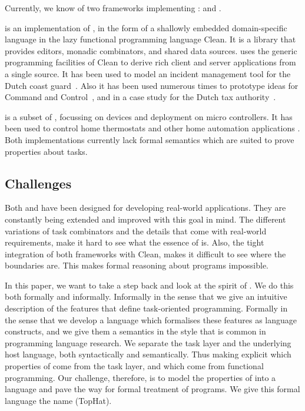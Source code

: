 Currently, we know of two frameworks implementing \TOP: \ITASKS and \MTASKS.

\ITASKS is an implementation of \TOP, in the form of a shallowly embedded domain-specific language in the lazy functional programming language Clean.
It is a library that provides editors, monadic combinators, and shared data sources.
\ITASKS uses the generic programming facilities of Clean to derive rich client and server applications from a single source.
It has been used to model an incident management tool for the Dutch coast guard~\cite{conf/iscram/LijnseJP12}.
Also it has been used numerous times to prototype ideas for Command and Control~\cite{theses/nlda/Kool17, theses/radboud/Stutterheim17}, and in a case study for the Dutch tax authority~\cite{conf/sfp/StutterheimAP17}.

\MTASKS is a subset of \ITASKS,
focussing on \IOT devices and deployment on micro controllers.
It has been used to control home thermostats and other home automation applications \cite{koopman2018task}.
%
Both implementations currently lack formal semantics which are suited to prove properties about tasks.



\subsection{Challenges}

Both \ITASKS and \MTASKS have been designed for developing real-world applications.
They are constantly being extended and improved with this goal in mind.
The different variations of task combinators and the details that come with real-world requirements,
make it hard to see what the essence of \TOP is.
Also, the tight integration of both frameworks with Clean, makes it difficult to see where the boundaries are.
This makes formal reasoning about \TOP programs impossible.

In this paper, we want to take a step back and look at the spirit of \TOP.
We do this both formally and informally.
Informally in the sense that we give an intuitive description of the features that define task-oriented programming.
Formally in the sense that we develop a language which formalises these features as language constructs,
and we give them a semantics in the style that is common in programming language research.
We separate the task layer and the underlying host language, both syntactically and semantically.
Thus making explicit which properties of \TOP come from the task layer, and which come from functional programming.
Our challenge, therefore, is to model the properties of \TOP into a language
and pave the way for formal treatment of \TOP programs.
We give this formal language the name \TOPHAT (TopHat).



